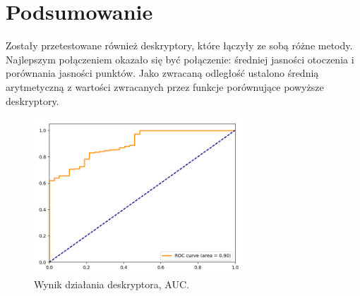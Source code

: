 \documentclass[a4paper,11pt]{article}
\begin{document}
\section{Podsumowanie}
Zostały przetestowane również deskryptory, które łączyły ze sobą różne metody.
Najlepszym połączeniem okazało się być połączenie: średniej jasności otoczenia i porównania jasności punktów.
Jako zwracaną odległość ustalono średnią arytmetyczną z wartości zwracanych przez funkcje porównujące powyższe deskryptory.

\begin{figure}[H]
\begin{center}
\includegraphics[width=0.7\textwidth]{./img/average_and_brief.png}
\end{center}
\caption{Wynik działania deskryptora, AUC.}
\end{figure}
\end{document}
